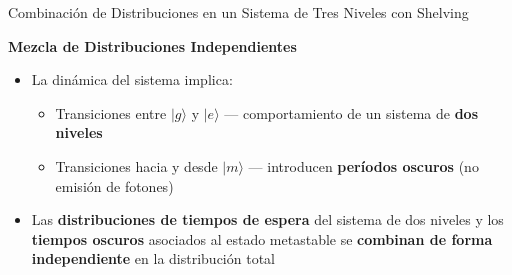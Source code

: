 \documentclass[11pt]{beamer}
\begin{document}
\begin{frame}{Combinación de Distribuciones en un Sistema de Tres Niveles con Shelving}

\textbf{Mezcla de Distribuciones Independientes}

\begin{itemize}
  

    \item La dinámica del sistema implica:
    \begin{itemize}
        \item Transiciones entre \( |g\rangle \) y \( |e\rangle \) — comportamiento de un sistema de \textbf{dos niveles}
        \item Transiciones hacia y desde \( |m\rangle \) — introducen \textbf{períodos oscuros} (no emisión de fotones)
    \end{itemize}
    \vspace{0.5em}
    \item Las \textbf{distribuciones de tiempos de espera} del sistema de dos niveles y los \textbf{tiempos oscuros} asociados al estado metastable se \textbf{combinan de forma independiente} en la distribución total
\end{itemize}
\end{frame}
\end{document}
